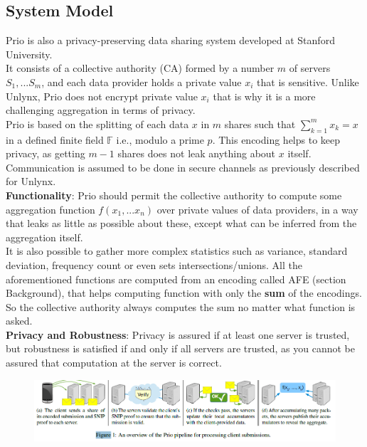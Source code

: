 \documentclass{article}
\begin{document}
\subsection{System Model}
Prio \cite{prio}  is also a privacy-preserving data sharing system developed at Stanford University.\\
It consists of a collective authority (CA) formed by a number $m$ of servers $S_1,...S_m$, and each data provider holds a private value $x_i$ that is sensitive. 
Unlike Unlynx, Prio does not encrypt private value $x_i$ that is why it is a more challenging aggregation in terms of privacy.\\
Prio is based on the splitting of each data $x$ in $m$ shares such that $\sum^m_{k=1}{x_k} = x $ in a defined finite field $\mathbb{F}$ i.e., modulo a prime $p$. This encoding helps to keep privacy, as getting $m-1$ shares does not leak anything about $x$ itself.\\
Communication is assumed to be done in secure channels as previously described for Unlynx.\\
\textbf{Functionality}: Prio should permit the collective authority to compute some aggregation function $f(x_1,...x_n)$ over private values of data providers, in a way that leaks as little as possible about these, except what can be inferred from the aggregation itself.\\
It is also possible to gather more complex statistics such as variance, standard deviation, frequency count or even sets intersections/unions. All the aforementioned functions are computed from an encoding called AFE (section Background), that helps computing function with only the \textbf{sum} of the encodings. So the collective authority always computes the sum no matter what function is asked.\\
\textbf{Privacy and Robustness}: Privacy is assured if at least one server is trusted, but robustness is satisfied if and only if all servers are trusted, as you cannot be assured that computation at the server is correct.
\begin{figure}[H]
\centering
\includegraphics[scale=0.5]{img/prioPip.png}
\end{figure}
\end{document}
